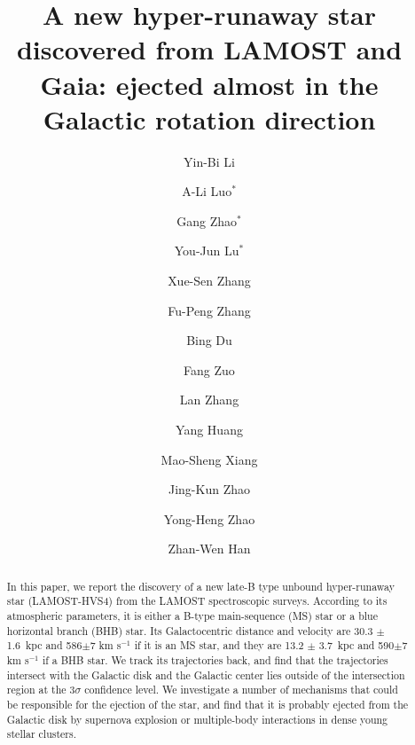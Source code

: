 \documentclass[iop, aj]{emulateapj}
\begin{document}
\title{A new hyper-runaway star discovered from LAMOST and Gaia: ejected almost in the Galactic rotation direction}

\author{Yin-Bi Li}
\author{A-Li Luo$^{*}$}
\author{Gang Zhao$^{*}$}
\author{You-Jun Lu$^{*}$}
\author{Xue-Sen Zhang}
\author{Fu-Peng Zhang}
\author{Bing Du}
\author{Fang Zuo}
\author{Lan Zhang}
\author{Yang Huang}
\author{Mao-Sheng Xiang}
\author{Jing-Kun Zhao}
\author{Yong-Heng Zhao}
\author{Zhan-Wen Han}



\begin{abstract}
In this paper, we report the discovery of a new late-B type unbound hyper-runaway star (LAMOST-HVS4) from the LAMOST spectroscopic surveys. According to its atmospheric parameters, it is either a B-type main-sequence (MS) star or a blue horizontal branch (BHB) star. Its Galactocentric distance and velocity are 30.3 $\pm$ 1.6~kpc and 586$\pm$7 km s$^{-1}$ if it is an MS star, and they are 13.2 $\pm$ 3.7~kpc and 590$\pm$7 km s$^{-1}$ if a BHB star. We track its trajectories back, and find that the trajectories intersect with the Galactic disk and the Galactic center lies outside of the intersection region at the 3$\sigma$ confidence level. We investigate a number of mechanisms that could be responsible for the ejection of the star, and find that it is probably ejected from the Galactic disk by supernova explosion or multiple-body interactions in dense young stellar clusters.

\end{abstract}
\end{document}
